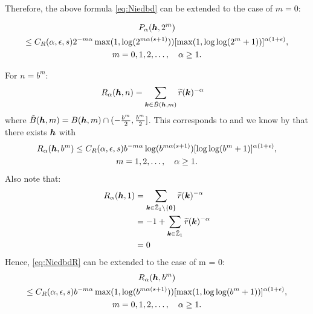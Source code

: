 \documentclass{amsart}
\newcommand{\tr}{\widetilde{r}}
\begin{document}
Therefore, the above formula \eqref{eq:Niedbd} can be extended to the case of $m=0$:

\begin{multline} \label{eq:Palphaextm}
    P_{\alpha}(\boldsymbol{h},2^m) \\
    \le C_{R}(\alpha,\epsilon,s)
    2^{-m\alpha}\max(1, \log(2^{m\alpha(s+1)})) [\max(1,\log \log (
    2^m+1))]^{\alpha(1+\epsilon)}, \\ m =0, 1, 2,\ldots, \quad \alpha \ge 1.
\end{multline}

For $n = b^m$: 
\begin{align}\label{eq:Ralphadual}
    R_\alpha(\vh,n) %
    &=  \sum_{\vk \in \tilde B(\vh,m)} \tr(\vk)^{-\alpha} 
\end{align} %
where $\tilde B(\boldsymbol{h},m) = B(\boldsymbol{h},m) \cap (-\frac{b^m}{2},\frac{b^m}{2}]$. This corresponds to \cite[Equation (5)]{HicNie03a} and we know by \cite[Theorem 5]{HicNie03a} that  there exists $\boldsymbol{h}$ with
\begin{multline} \label{eq:NiedbdR}
    R_{\alpha}(\boldsymbol{h},b^m) \le C_{R}(\alpha,\epsilon,s)
    b^{-m\alpha} \log(b^{m\alpha(s+1)}) [\log \log (
    b^m+1)]^{\alpha(1+\epsilon)}, \\ m = 1, 2,\ldots, \quad \alpha \ge 1.
\end{multline}
Also note that:
\begin{align*}
    R_{\alpha}(\vh,1)  &= \sum_{\vk \in \tilde \integers_1 \setminus\{\vzero\}} \tr(\vk)^{-\alpha} \\
    &= -1 + \sum_{\vk \in \tilde \integers_1 } \tr(\vk)^{-\alpha} \\
    &= 0 %
\end{align*}
Hence, \eqref{eq:NiedbdR} can be extended to the case of m = 0:
\begin{multline} \label{eq:Palphaextm}
    R_{\alpha}(\boldsymbol{h},b^m) \\
    \le C_{R}(\alpha,\epsilon,s)
    b^{-m\alpha}\max(1, \log(b^{m\alpha(s+1)})) [\max(1,\log \log (
    b^m+1))]^{\alpha(1+\epsilon)}, \\ m =0, 1, 2,\ldots, \quad \alpha \ge 1.
\end{multline}
\end{document}
